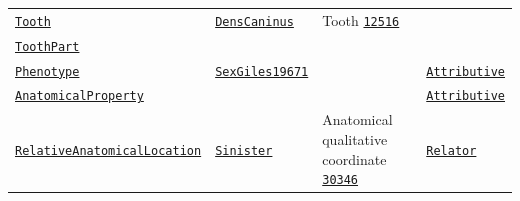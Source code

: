 \documentclass[sw]{iosart2x}
\newcommand{\anno}[1]{\href{https://annosaxfdm.de/ontology/#1}{\texttt{#1}}}
\newcommand{\gfo}[1]{\href{https://www.onto-med.de/ontologies/gfo/#1}{\texttt{#1}}}
\newcommand{\fma}[1]{\href{http://purl.org/sig/ont/fma/fma#1}{\texttt{#1}}}
\begin{document}
\begin{table}[b]
\begin{tabulary}{\textwidth}{llLl}
	\anno{Tooth}					&\anno{DensCaninus}			&Tooth \fma{12516}\\
	\anno{ToothPart}\\%
	\anno{Phenotype}				&\anno{SexGiles19671}			&											&\gfo{Attributive}\\
	\anno{AnatomicalProperty}		&						&													&\gfo{Attributive}\\
	\anno{RelativeAnatomicalLocation}&\anno{Sinister}	&Anatomical qualitative coordinate \fma{30346}	&\gfo{Relator}\\
\bottomrule
\end{tabulary}
\end{table}
\end{document}
